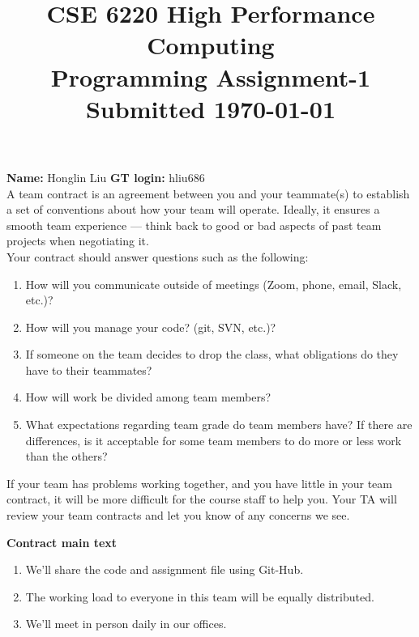 \documentclass[11pt]{article}
\begin{document}
\title{\large\bf \vspace*{-0.3in}CSE 6220 High Performance Computing\\
Programming Assignment-1 \\Submitted \today}
\author{}
\date{}
\maketitle
\vspace*{-0.8in}
{\bf Name:} Honglin Liu \hfill{{\bf GT login:} hliu686}\\

A team contract is an agreement between you and your teammate(s) to establish a set of conventions about how your team will operate. 
Ideally, it ensures a smooth team experience — think back to good or bad aspects of past team projects when negotiating it.\\

Your contract should answer questions such as the following:
\begin{enumerate}
	\item How will you communicate outside of meetings (Zoom, phone, email, Slack, etc.)?
	\item How will you manage your code? (git, SVN, etc.)?
	\item If someone on the team decides to drop the class, what obligations do they have to their teammates?
	\item How will work be divided among team members?
	\item What expectations regarding team grade do team members have? If there are differences, is it acceptable for some team members to do more or less work than the others?
\end{enumerate}

If your team has problems working together, and you have little in your team contract, it will be more difficult for the course staff to help you. Your TA will review your team contracts and let you know of any concerns we see.



\newpage
\textbf{Contract main text}
\begin{enumerate}
	\item We'll share the code and assignment file using Git-Hub.
 	\item The working load to everyone in this team will be equally distributed.
  	\item We'll meet in person daily in our offices.
\end{enumerate}
\end{document}
